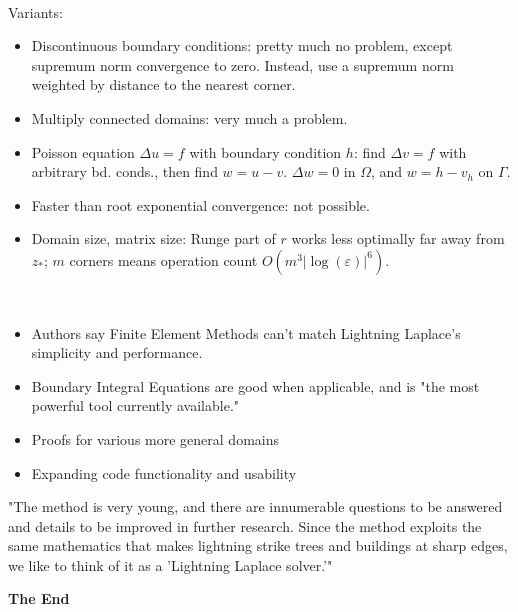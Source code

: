 \documentclass{seminar}
\begin{document}
\begin{slide} %
{} \small \\

Variants:
\begin{itemize}
	\item Discontinuous boundary conditions: pretty much no problem, except supremum norm convergence to zero. Instead, use a supremum norm weighted by distance to the nearest corner.
	\item Multiply connected domains: very much a problem.
	\item Poisson equation $\Delta u = f$ with boundary condition $h$: find $\Delta v = f$ with arbitrary bd. conds., then find $w=u-v$. $\Delta w =0$ in $\Omega$, and $w=h-v_h$ on $\Gamma$.
	\item Faster than root exponential convergence: not possible.
	\item Domain size, matrix size: Runge part of $r$ works less optimally far away from $z_*$; $m$ corners means operation count $O(m^3 |\log{(\varepsilon)}|^6)$.
\end{itemize}
\end{slide} %

\begin{slide} %
{} \small \\

\begin{itemize}
	\item Authors say Finite Element Methods can't match Lightning Laplace's simplicity and performance.
	\item Boundary Integral Equations are good when applicable, and is "the most powerful tool currently available."
	\item Proofs for various more general domains
	\item Expanding code functionality and usability 
\end{itemize}
\end{slide} %




\begin{slide} %
\vspace*{\fill}
\begin{center}
"The method is very young, and there are innumerable questions to be answered and details to be improved in further research. Since the method exploits the same mathematics that makes lightning strike trees and buildings at sharp edges, we like to think of it as a 'Lightning Laplace solver.'"
\end{center}
\vspace*{\fill}
\begin{center}
{\large\bf\color{Green} The End}
\end{center}
\vspace*{\fill}
\end{slide}
\end{document}
